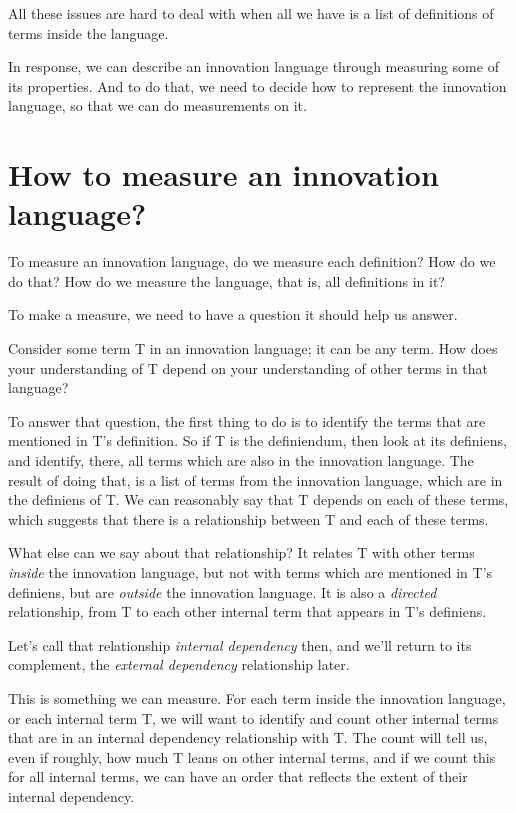 All these issues are hard to deal with when all we have is a list of definitions of terms inside the language. 

In response, we can describe an innovation language through measuring some of its properties. And to do that, we need to decide how to represent the innovation language, so that we can do measurements on it. 


\section{How to measure an innovation language?}
\label{c7:s2}
To measure an innovation language, do we measure each definition? How do we do that? How do we measure the language, that is, all definitions in it?

To make a measure, we need to have a question it should help us answer. 

Consider some term T in an innovation language; it can be any term. How does your understanding of T depend on your understanding of other terms in that language?

To answer that question, the first thing to do is to identify the terms that are mentioned in T's definition. So if T is the definiendum, then look at its definiens, and identify, there, all terms which are also in the innovation language. The result of doing that, is a list of terms from the innovation language, which are in the definiens of T. We can reasonably say that T depends on each of these terms, which suggests that there is a relationship between T and each of these terms.

What else can we say about that relationship? It relates T with other terms \textit{inside} the innovation language, but not with terms which are mentioned in T's definiens, but are \textit{outside} the innovation language. It is also a \textit{directed} relationship, from T to each other internal term that appears in T's definiens. 

Let's call that relationship \textit{internal dependency} then, and we'll return to its complement, the \textit{external dependency} relationship later. 

This is something we can measure. For each term inside the innovation language, or each internal term T, we will want to identify and count other internal terms that are in an internal dependency relationship with T. The count will tell us, even if roughly, how much T leans on other internal terms, and if we count this for all internal terms, we can have an order that reflects the extent of their internal dependency.

